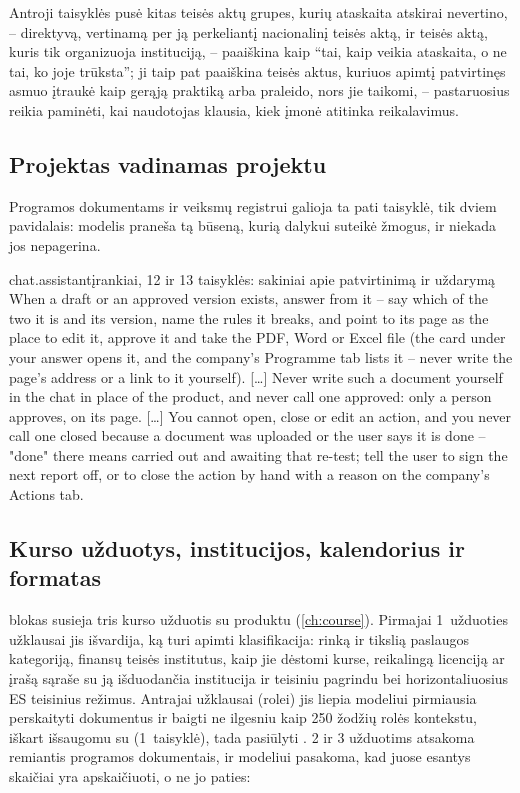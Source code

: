 Antroji taisyklės pusė kitas teisės aktų grupes, kurių ataskaita atskirai nevertino, --
direktyvą, vertinamą per ją perkeliantį nacionalinį teisės aktą, ir teisės aktą, kuris tik
organizuoja instituciją, -- paaiškina kaip \enquote{tai, kaip veikia ataskaita, o ne tai, ko joje
trūksta}; ji taip pat paaiškina teisės aktus, kuriuos apimtį patvirtinęs asmuo įtraukė kaip
gerąją praktiką arba praleido, nors jie taikomi, -- pastaruosius reikia paminėti, kai naudotojas
klausia, kiek įmonė atitinka reikalavimus.

\subsection{Projektas vadinamas projektu}

Programos dokumentams ir veiksmų registrui galioja ta pati taisyklė, tik dviem pavidalais:
modelis praneša tą būseną, kurią dalykui suteikė žmogus, ir niekada jos nepagerina.

\begin{promptexcerpt}{chat.assistant}{įrankiai, 12 ir 13 taisyklės: sakiniai apie patvirtinimą ir uždarymą}
When a draft or an approved version exists, answer from it – say which of the two it is and its version, name the rules it breaks, and point to its page as the place to edit it, approve it and take the PDF, Word or Excel file (the card under your answer opens it, and the company's Programme tab lists it – never write the page's address or a link to it yourself).
[…]
Never write such a document yourself in the chat in place of the product, and never call one approved: only a person approves, on its page.
[…]
You cannot open, close or edit an action, and you never call one closed because a document was uploaded or the user says it is done – "done" there means carried out and awaiting that re-test; tell the user to sign the next report off, or to close the action by hand with a reason on the company's Actions tab.
\end{promptexcerpt}

\subsection{Kurso užduotys, institucijos, kalendorius ir formatas}

 blokas susieja tris kurso užduotis su produktu (\cref{ch:course}). Pirmajai
1~užduoties užklausai jis išvardija, ką turi apimti klasifikacija: rinką ir tikslią paslaugos
kategoriją, finansų teisės institutus, kaip jie dėstomi kurse, reikalingą licenciją ar įrašą
sąraše su ją išduodančia institucija ir teisiniu pagrindu bei horizontaliuosius ES teisinius
režimus. Antrajai užklausai (rolei) jis liepia modeliui pirmiausia perskaityti dokumentus ir
baigti ne ilgesniu kaip 250 žodžių rolės kontekstu, iškart išsaugomu su 
(1~taisyklė), tada pasiūlyti . 2 ir 3 užduotims atsakoma remiantis programos dokumentais, ir modeliui
pasakoma, kad juose esantys skaičiai yra apskaičiuoti, o ne jo paties:

